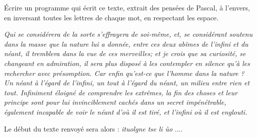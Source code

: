
Écrire un programme qui écrit ce texte, extrait des pensées de Pascal, à l'envers, en inversant toutes les lettres de chaque mot, en respectant les espace.

\vspace{0.4cm}

\textit{Qui se considérera de la sorte s'effrayera de soi-même, et, se considérant soutenu dans la masse que la nature lui a donnée, entre ces deux abîmes de l'infini et du néant, il tremblera dans la vue de ces merveilles; et je crois que sa curiosité, se changeant en admiration, il sera plus disposé à les contempler en silence qu'à les rechercher avec présomption. Car enfin qu'est-ce que l'homme dans la nature ? Un néant à l'égard de l'infini, un tout à l'égard du néant, un milieu entre rien et tout. Infiniment éloigné de comprendre les extrêmes, la fin des choses et leur principe sont pour lui invinciblement cachés dans un secret impénétrable, également incapable de voir le néant d'où il est tiré, et l'infini où il est englouti. }

\vspace{0.4cm}

Le début du texte renvoyé sera alors : \textit{ituolgne tse li ùo} ....
